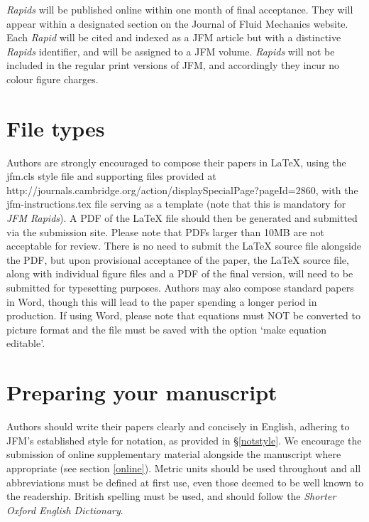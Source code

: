 \documentclass{jfm}
\begin{document}
{\it Rapids} will be published online within one month of final acceptance.  They will appear within a designated section on the Journal of Fluid Mechanics website.  Each {\it Rapid} will be cited and indexed as a JFM article but with a distinctive {\it Rapids} identifier, and will be assigned to a JFM volume. {\it Rapids} will not be included in the regular print versions of JFM, and accordingly they incur no colour figure charges.
 
\section{File types}\label{sec:filetypes}
Authors are strongly encouraged to compose their papers in {\LaTeX}, using the jfm.cls style file and supporting files provided at\\ http://journals.cambridge.org/action/displaySpecialPage?pageId=2860, with the jfm-instructions.tex file serving as a template (note that this is mandatory for {\it JFM Rapids}). A PDF of the {\LaTeX} file should then be generated and submitted via the submission site. Please note that PDFs larger than 10MB are not acceptable for review. There is no need to submit the {\LaTeX} source file alongside the PDF, but upon provisional acceptance of the paper, the {\LaTeX} source file, along with individual figure files and a PDF of the final version, will need to be submitted for typesetting purposes. 
Authors may also compose standard papers in Word, though this will lead to the paper spending a longer period in production. If using Word, please note that equations must NOT be converted to picture format and the file must be saved with the option `make equation editable'. 
\section{Preparing your manuscript}
Authors should write their papers clearly and concisely in English, adhering to JFM's established style for notation, as provided in \S\ref{notstyle}. We encourage the submission of online supplementary material alongside the manuscript where appropriate (see section \ref{online}). Metric units should be used throughout and all abbreviations must be defined at first use, even those deemed to be well known to the readership. British spelling must be used, and should follow the \textit{Shorter Oxford English Dictionary}.
\end{document}
